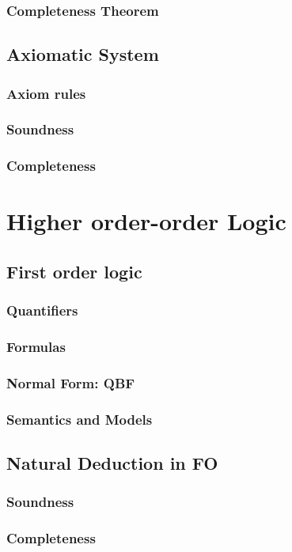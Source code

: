 \section{Completeness Theorem}

\chapter{Axiomatic System}
\section{Axiom rules}
\section{Soundness}
\section{Completeness}


\part{Higher order-order Logic}
\chapter{First order logic}
\section{Quantifiers}
\section{Formulas}
\section{Normal Form: QBF}
\section{Semantics and Models}
\chapter{Natural Deduction in FO}
\section{Soundness}
\section{Completeness}

